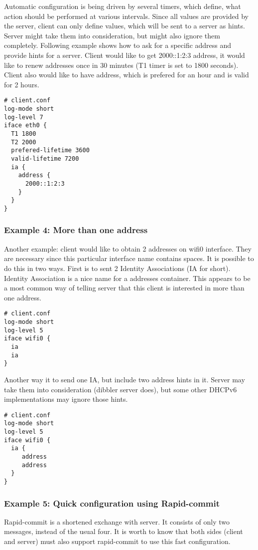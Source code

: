 Automatic configuration is being driven by several timers, which define,
what action should be performed at various intervals. Since all
values are provided by the server, client can only define values, which
will be sent to a server as hints. Server might take them into
consideration, but might also ignore them
completely. Following example shows how to ask for a specific address
and provide hints for a server. Client would like to get 2000::1:2:3
address, it would like to renew addresses once in 30 minutes (T1 timer
is set to 1800 seconds). Client also would like to have address, which
is prefered for an hour and is valid for 2 hours. 

\begin{lstlisting}
# client.conf
log-mode short
log-level 7
iface eth0 {
  T1 1800
  T2 2000
  prefered-lifetime 3600
  valid-lifetime 7200
  ia {
    address { 
      2000::1:2:3
    }
  }
}
\end{lstlisting}

\subsubsection{Example 4: More than one address}

Another example: client would like to obtain 2 addresses on
wifi0 interface. They are necessary since this particular interface name
contains spaces. It is possible to do this in two ways. First is to
sent 2 Identity Associations (IA for short). Identity Association is a
nice name for a addresses container. This appears to be a most common
way of telling server that this client is interested in more than one
address. 

\begin{lstlisting}
# client.conf
log-mode short
log-level 5
iface wifi0 {
  ia
  ia
}
\end{lstlisting}

Another way it to send one IA, but include two address hints in
it. Server may take them into consideration (dibbler server does), but
some other DHCPv6 implementations may ignore those hints.

\begin{lstlisting}
# client.conf
log-mode short
log-level 5
iface wifi0 {
  ia {
     address
     address
  }
}
\end{lstlisting}

\subsubsection{Example 5: Quick configuration using Rapid-commit}
Rapid-commit is a shortened exchange with server. It consists of only
two messages, instead of the usual four. It is worth to know that both sides (client
and server) must also support rapid-commit to use this fast
configuration. 

